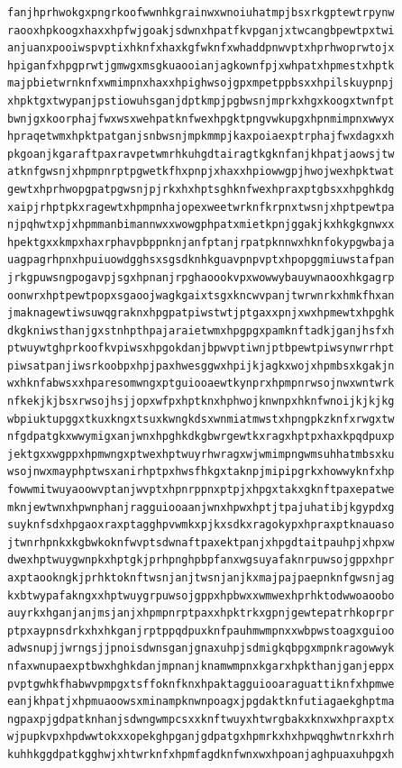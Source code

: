 \documentclass[11pt,letterpaper]{exam}
\begin{document}
\begin{questions}
\begin{verbatim}
fanjhprhwokgxpngrkoofwwnhkgrainwxwnoiuhatmpjbsxrkgptewtrpynw
raooxhpkoogxhaxxhpfwjgoakjsdwnxhpatfkvpganjxtwcangbpewtpxtwi
anjuanxpooiwspvptixhknfxhaxkgfwknfxwhaddpnwvptxhprhwoprwtojx
hpiganfxhpgprwtjgmwgxmsgkuaooianjagkownfpjxwhpatxhpmestxhptk
majpbietwrnknfxwmimpnxhaxxhpighwsojgpxmpetppbsxxhpilskuypnpj
xhpktgxtwypanjpstiowuhsganjdptkmpjpgbwsnjmprkxhgxkoogxtwnfpt
bwnjgxkoorphajfwxwsxwehpatknfwexhpgktpngvwkupgxhpnmimpnxwwyx
hpraqetwmxhpktpatganjsnbwsnjmpkmmpjkaxpoiaexptrphajfwxdagxxh
pkgoanjkgaraftpaxravpetwmrhkuhgdtairagtkgknfanjkhpatjaowsjtw
atknfgwsnjxhpmpnrptpgwetkfhxpnpjxhaxxhpiowwgpjhwojwexhpktwat
gewtxhprhwopgpatpgwsnjpjrkxhxhptsghknfwexhpraxptgbsxxhpghkdg
xaipjrhptpkxragewtxhpmpnhajopexweetwrknfkrpnxtwsnjxhptpewtpa
njpqhwtxpjxhpmmanbimannwxxwowgphpatxmietkpnjggakjkxhkgkgnwxx
hpektgxxkmpxhaxrphavpbppnknjanfptanjrpatpknnwxhknfokypgwbaja
uagpagrhpnxhpuiuowdgghsxsgsdknhkguavpnpvptxhpopggmiuwstafpan
jrkgpuwsngpogavpjsgxhpnanjrpghaoookvpxwowwybauywnaooxhkgagrp
oonwrxhptpewtpopxsgaoojwagkgaixtsgxkncwvpanjtwrwnrkxhmkfhxan
jmaknagewtiwsuwqgraknxhpgpatpiwstwtjptgaxxpnjxwxhpmewtxhpghk
dkgkniwsthanjgxstnhpthpajaraietwmxhpgpgxpamknftadkjganjhsfxh
ptwuywtghprkoofkvpiwsxhpgokdanjbpwvptiwnjptbpewtpiwsynwrrhpt
piwsatpanjiwsrkoobpxhpjpaxhwesggwxhpijkjagkxwojxhpmbsxkgakjn
wxhknfabwsxxhparesomwngxptguiooaewtkynprxhpmpnrwsojnwxwntwrk
nfkekjkjbsxrwsojhsjjopxwfpxhptknxhphwojknwnpxhknfwnoijkjkjkg
wbpiuktupggxtkuxkngxtsuxkwngkdsxwnmiatmwstxhpngpkzknfxrwgxtw
nfgdpatgkxwwymigxanjwnxhpghkdkgbwrgewtkxragxhptpxhaxkpqdpuxp
jektgxxwgppxhpmwngxptwexhptwuyrhwragxwjwmimpngwmsuhhatmbsxku
wsojnwxmayphptwsxanirhptpxhwsfhkgxtaknpjmipipgrkxhowwyknfxhp
fowwmitwuyaoowvptanjwvptxhpnrppnxptpjxhpgxtakxgknftpaxepatwe
mknjewtwnxhpwnphanjragguiooaanjwnxhpwxhptjtpajuhatibjkgypdxg
suyknfsdxhpgaoxraxptagghpvwmkxpjkxsdkxragokypxhpraxptknauaso
jtwnrhpnkxkgbwkoknfwvptsdwnaftpaxektpanjxhpgdtaitpauhpjxhpxw
dwexhptwuygwnpkxhptgkjprhpnghpbpfanxwgsuyafaknrpuwsojgppxhpr
axptaookngkjprhktoknftwsnjanjtwsnjanjkxmajpajpaepnknfgwsnjag
kxbtwypafakngxxhptwuygrpuwsojgppxhpbwxxwmwexhprhktodwwoaoobo
auyrkxhganjanjmsjanjxhpmpnrptpaxxhpktrkxgpnjgewtepatrhkoprpr
ptpxaypnsdrkxhxhkganjrptppqdpuxknfpauhmwmpnxxwbpwstoagxguioo
adwsnupjjwrngsjjpnoisdwnsganjgnaxuhpjsdmigkqbpgxmpnkragowwyk
nfaxwnupaexptbwxhghkdanjmpnanjknamwmpnxkgarxhpkthanjganjeppx
pvptgwhkfhabwvpmpgxtsffoknfknxhpaktagguiooaraguattiknfxhpmwe
eanjkhpatjxhpmuaoowsxminampknwnpoagxjpgdaktknfutiagaekghptma
ngpaxpjgdpatknhanjsdwngwmpcsxxknftwuyxhtwrgbakxknxwxhpraxptx
wjpupkvpxhpdwwtokxxopekghpganjgdpatgxhpmrkxhxhpwqghwtnrkxhrh
kuhhkggdpatkgghwjxhtwrknfxhpmfagdknfwnxwxhpoanjaghpuaxuhpgxh

\end{verbatim}
\end{questions}
\end{document}
